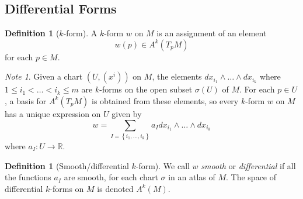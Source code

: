 \documentclass[reqno]{amsart}
\theoremstyle{definition}
\newtheorem{definition}[theorem]{Definition}
\theoremstyle{remark}
\newtheorem*{note}{Note}
\begin{document}
      \subsection{Differential Forms}

      \begin{definition}[$k$-form]
          A $k$-form
          $w$ on $M$ is an assignment of an element
          \[
          w(p) \in A^{k}(T_pM)
          \] 
          for each $p \in M$.
      \end{definition}

      \begin{note}
          Given a chart $\left( U, (x^{i}) \right) $ on
          $M$, the elements
          $dx_{i_1} \wedge \ldots \wedge
          dx_{i_k}$ where $1 \le i_1 < \ldots <
          i_k \le m$ are $k$-forms on the open
          subset $\sigma (U)$ of $M$.
          For each $p \in U$, a basis for
          $A^{k}\left( T_pM \right) $ is obtained
          from these elements, so every
          $k$-form $w$ on $M$ has a unique expression
          on $U$ given by
          \[
          w = 
          \sum_{I = \left\{ i_1,\ldots,i_k \right\} }
          a_I dx_{i_1} \wedge \ldots \wedge dx_{i_k}
          \] 
          where $a_I \colon U \to \mathbb{R}$.
      \end{note}

      \begin{definition}[Smooth/differential $k$-form]
          We call $w$ \textit{smooth} or 
          \textit{differential} if all the
          functions $a_I$ are smooth, for each
          chart $\sigma$ in an atlas of $M$. The
          space of differential $k$-forms on $M$ is denoted
          $A^{k}(M)$.
      \end{definition}





\end{document}
